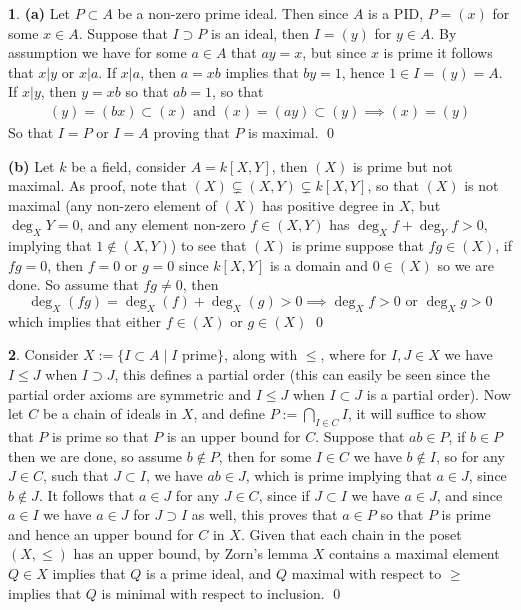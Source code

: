 \documentclass[11pt]{article}
\theoremstyle{definition}
\newtheorem{pb}{}
\newcommand{\set}[1]{\{#1\}}
\newcommand{\tand}{\text{ and }}
\newcommand{\tor}{\text{ or }}
\begin{document}
    \begin{pb}
        \textbf{(a)} Let \(P \subset A\) be a non-zero prime ideal. Then since \(A\) is a PID, \(P = (x)\) for some \(x \in A\). Suppose that \(I \supset P\) is an ideal, then \(I = (y)\) for \(y \in A\). By assumption we have for some \(a \in A\) that \(ay = x\), but since \(x\) is prime it follows that \(x \vert y\) or \(x \vert a\). If \(x \vert a\), then
        \(a = xb\) implies that \(by = 1\), hence \(1 \in I = (y) = A\). If \(x \vert y\), then \(y = xb\) so that \(ab = 1\), so that
        \begin{align*}
            (y) = (bx) \subset (x) \tand (x) = (ay) \subset (y) \implies (x) = (y)
        \end{align*}
        So that \(I = P\) or \(I = A\) proving that \(P\) is maximal. \qed

        \textbf{(b)} Let \(k\) be a field, consider \(A = k[X,Y]\), then \((X)\) is prime but not maximal. As proof, note that \((X) \subsetneq (X,Y) \subsetneq k[X,Y]\), so that \((X)\) is not maximal (any non-zero element of \((X)\) has positive degree in \(X\), but \(\deg_X Y = 0\), and any element non-zero \(f \in (X,Y)\) has \(\deg_X f + \deg_Y f > 0\), implying that \(1 \not \in (X,Y)\)) to see that \((X)\) is prime suppose that \(fg \in (X)\), if \(fg = 0\), then \(f = 0 \tor g = 0\) since \(k[X,Y]\) is a domain and \(0 \in (X)\) so we are done. So assume that \(fg \neq 0\), then
        \[\deg_X(fg) = \deg_X(f) + \deg_X(g) > 0 \implies \deg_X f > 0 \tor \deg_X g > 0\]
        which implies that  either \(f \in (X)\) or \(g \in (X)\) \qed
    \end{pb}
    \begin{pb}
        Consider \(X := \set{I \subset A \mid I \text{ prime}}\), along with \(\leq\), where for \(I,J \in X\) we have \(I \leq J\) when \(I \supset J\), this defines a partial order (this can easily be seen since the partial order axioms are symmetric and \(I \leq J\) when \(I \subset J\) is a partial order). Now let \(C\) be a chain of ideals  in \(X\), and define \(P := \bigcap_{I \in C} I\), it will suffice to show that \(P\) is prime so that \(P\) is an upper bound for \(C\). Suppose that \(ab \in P\), if \(b \in P\) then we are done, so assume \(b \not \in P\), then for some \(I \in C\) we have \(b \not \in I\), so for any  \(J \in C\), such that \(J \subset I\), we have \(ab \in J\), which is prime implying that \(a \in J\), since \(b \not \in J\). It follows that \(a \in J\) for any \(J \in C\), since if \(J \subset I\) we have \(a \in J\), and since \(a \in I\) we have \(a \in J\) for \(J \supset I\) as well, this proves that \(a \in P\) so that \(P\) is prime and hence an upper bound for \(C\) in \(X\). Given that each chain in the poset \((X,\leq)\) has an upper bound, by Zorn's lemma \(X\) contains a maximal element \(Q \in X\) implies that \(Q\) is a prime ideal, and \(Q\) maximal with respect to \(\geq\) implies that \(Q\) is minimal with respect to inclusion. \qed
    \end{pb}
\end{document}

